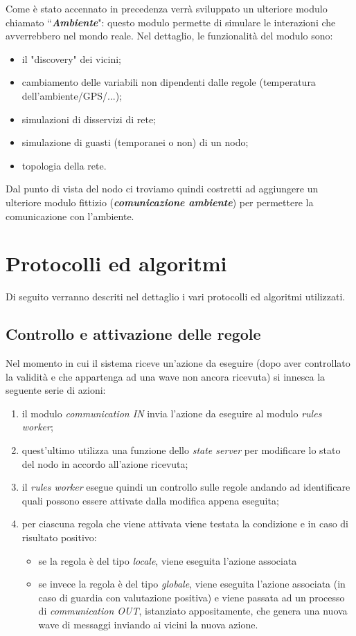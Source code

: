 \documentclass[italian]{memoir}
\begin{document}
Come è stato accennato in precedenza verrà sviluppato un ulteriore modulo chiamato
``\textbf{\textit{Ambiente}}": questo modulo permette di simulare le interazioni
	   che avverrebbero nel mondo reale. Nel dettaglio, le funzionalità del modulo
	   sono:
\begin{itemize}
	\item il "discovery" dei vicini;
	\item cambiamento delle variabili non dipendenti dalle regole (temperatura dell'ambiente/GPS/...);
	\item simulazioni di disservizi di rete;
	\item simulazione di guasti (temporanei o non) di un nodo;
	\item topologia della rete.
\end{itemize}
Dal punto di vista del nodo ci troviamo quindi costretti ad aggiungere un ulteriore
	   modulo fittizio (\textbf{\textit{comunicazione ambiente}}) per permettere la
	   comunicazione
	   con l'ambiente.

\section{Protocolli ed algoritmi}

Di seguito verranno descriti nel dettaglio i vari protocolli ed algoritmi utilizzati.

\subsection{Controllo e attivazione delle regole}

Nel momento in cui il sistema riceve un'azione da eseguire (dopo aver controllato la validità e che appartenga ad una wave non ancora ricevuta) si innesca la seguente serie di azioni:
\begin{enumerate}
\item il modulo \textit{communication IN} invia l'azione da eseguire al modulo \textit{rules worker};
\item quest'ultimo utilizza una funzione dello \textit{state server} per modificare lo stato del nodo in accordo all'azione ricevuta;
\item il \textit{rules worker} esegue quindi un controllo sulle regole andando ad identificare quali possono essere attivate dalla modifica appena eseguita;
\item per ciascuna regola che viene attivata viene testata la condizione e in caso di risultato positivo:
\begin{itemize}
\item se la regola è del tipo \textit{locale}, viene eseguita l'azione associata
\item se invece la regola è del tipo \textit{globale}, viene eseguita l'azione associata (in caso di guardia con valutazione positiva) e viene passata ad un processo di \textit{communication OUT}, istanziato appositamente, che genera una nuova wave di messaggi inviando ai vicini la nuova azione.
\end{itemize}
\end{enumerate}
\end{document}

